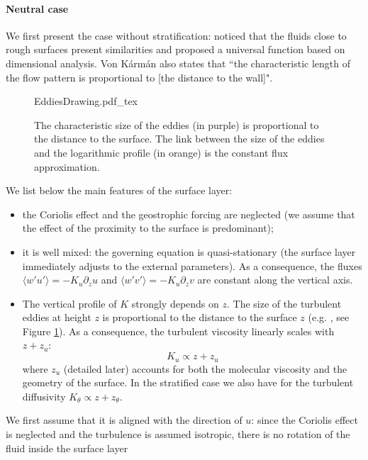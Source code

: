 \paragraph{Neutral case}
We first present the case without stratification:
\citep{karman_mechanische_1930} noticed that the
fluids close to rough surfaces present similarities and
proposed a universal function based on dimensional analysis.
Von K\'arm\'an also states that ``the characteristic length
of the flow pattern is proportional to
[the distance to the wall]".
\par
\begin{figure}[h!]
	\centering
	{EddiesDrawing.pdf_tex}
	\caption{The characteristic size of the eddies
	(in purple) is proportional to the distance to the
	surface. The link between the size of the eddies
	and the logarithmic profile (in orange) is
	the constant flux approximation.
	}
	\label{fig:airseaSCM_eddiesDrawing}
\end{figure}
We list below the main features of the surface layer:
\begin{itemize}
	\item the Coriolis effect and the geostrophic forcing are
		neglected (we assume that the effect of the
		proximity to the surface is predominant);
	\item it is well mixed: the governing equation
		is quasi-stationary (the surface layer
		immediately adjusts to the external parameters).
		As a consequence, the fluxes
		$\langle w'u'\rangle = -K_u \partial_z u$
		and
		$\langle w'v'\rangle = -K_u \partial_z v$
		are constant along the vertical axis.
	\item The vertical profile of $K$ strongly depends 
		on $z$.
		The size of the turbulent eddies at height $z$
		is proportional to the distance to the surface $z$
		(e.g. \citep{kawai_wall-modeling_2012}, see Figure
		\ref{fig:airseaSCM_eddiesDrawing}).
		As a consequence, the turbulent viscosity
		linearly scales with $z+z_u$:
		\begin{equation}
			K_u \propto z+z_u
		\end{equation}
		where $z_u$ (detailed later) accounts for both the
		molecular viscosity and the geometry of the surface.
		In the stratified case we also have for the turbulent
		diffusivity $K_\theta \propto z+z_\theta$.
\end{itemize}
We first assume that it is aligned with the
direction of $u$: since the Coriolis effect
is neglected and the turbulence is assumed isotropic,
there is no rotation of the fluid inside the surface layer
